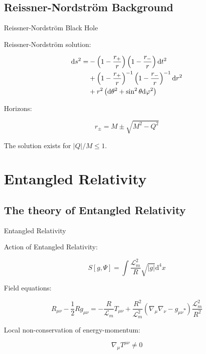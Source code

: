 \documentclass{beamer}
\newcommand{\paren}[1]{\left( #1 \right)}
\newcommand{\bracket}[1]{\left[ #1 \right]}
\newcommand{\mrm}{\mathrm}
\newcommand{\mcal}{\mathcal}
\begin{document}
\subsection{Reissner-Nordström Background}
\begin{frame}{Reissner-Nordström Black Hole}

    Reissner-Nordström solution:

    \begin{align}
        \mrm ds^2 = &-\paren{1 - \frac{r_+}{r}}\paren{1 - \frac{r_-}{r}}\mrm dt^2 \notag\\
        & + \paren{1 - \frac{r_+}{r}}^{-1}\paren{1 - \frac{r_-}{r}}^{-1}\mrm dr^2 \notag\\
        & + r^2 \paren{\mrm d\theta^2 + \sin^2\theta \mrm d\varphi^2}
    \end{align}

    Horizons:

    \begin{equation}
        r_\pm = M \pm \sqrt{M^2 - Q^2}
    \end{equation}

    The solution exists for $|Q|/M \leq 1$.
  
\end{frame}

\section{Entangled Relativity}
\subsection{The theory of Entangled Relativity}
\begin{frame}{Entangled Relativity}

    Action of Entangled Relativity:

    \begin{equation}
        S\bracket{g, \Psi} = \int \frac{\mcal L_m^2}{R}\sqrt{|g|}\mrm d^4x
    \end{equation}

    Field equations:

    \begin{equation}
        R_{\mu\nu} - \frac{1}{2}Rg_{\mu\nu} = -\frac{R}{\mcal L_m}T_{\mu\nu}+\frac{R^2}{\mcal L_m^2}\paren{\nabla_\mu\nabla_\nu - g_{\mu\nu}\square}\frac{\mcal L_m^2}{R^2}
    \end{equation}

    Local non-conservation of energy-momentum:

    \begin{equation}
        \nabla_\mu T^{\mu\nu} \neq 0
    \end{equation}
  
\end{frame}
\end{document}
